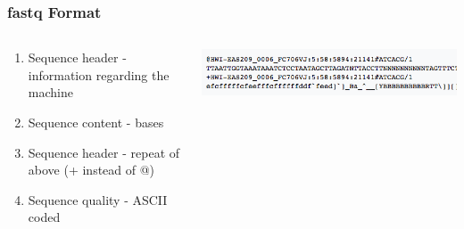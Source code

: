 \documentclass[14pt]{beamer}
\begin{document}
\begin{frame}
\frametitle{fastq Format}
\begin{columns}
	\begin{column}{0.5\textwidth}
	\begin{enumerate}
		\item<+-> Sequence header - information regarding the machine
		\item<+-> Sequence content - bases
		\item<+-> Sequence header - repeat of above (+ instead of @)
		\item<+-> Sequence quality - ASCII coded
	\end{enumerate}
	\end{column}
	\begin{column}{0.5\textwidth}
	\begin{center}
    	\includegraphics[width=1\textwidth]{images_20170912_fastq.png}
    \end{center}
	\end{column}
\end{columns}
\end{frame}
\end{document}

